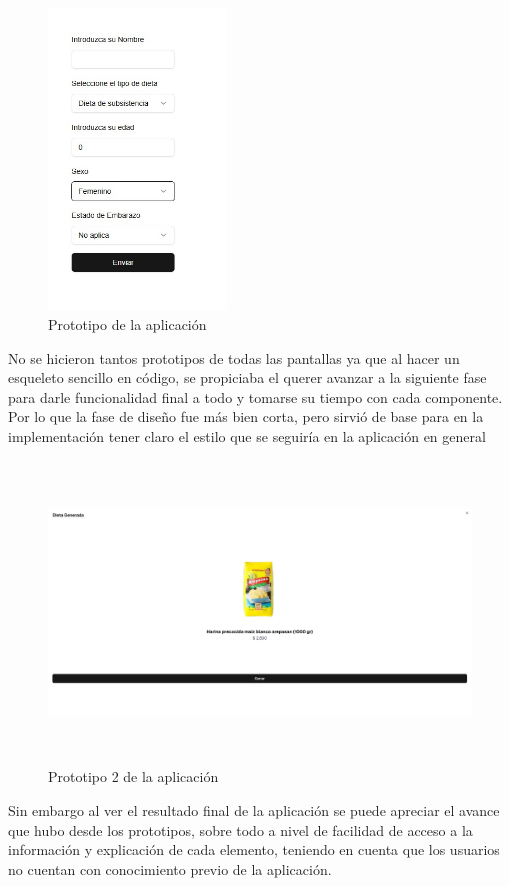 \begin{figure}[H]
        \centering
        \includegraphics[height=8cm]{img/Diseno/prototipo.png}
        \caption{Prototipo de la aplicaci\'on}
        \label{fig:Prototipo}
    \end{figure}

No se hicieron tantos prototipos de todas las pantallas ya que al hacer un esqueleto sencillo en c\'odigo, se propiciaba el querer avanzar a la siguiente fase para darle funcionalidad final a todo y tomarse su tiempo con cada componente. Por lo que la fase de dise\~{n}o fue m\'as bien corta, pero sirvi\'o de base para en la implementaci\'on tener claro el estilo que se seguir\'ia en la aplicaci\'on en general


\begin{figure}[H]
        \centering
        \includegraphics[height=8cm]{img/Diseno/prototipo2.jpeg}
        \caption{Prototipo 2 de la aplicaci\'on}
        \label{fig:Prototipo2}
    \end{figure}

Sin embargo al ver el resultado final de la aplicaci\'on se puede apreciar el avance que hubo desde los prototipos, sobre todo a nivel de facilidad de acceso a la informaci\'on y explicaci\'on de cada elemento, teniendo en cuenta que los usuarios no cuentan con conocimiento previo de la aplicaci\'on.
